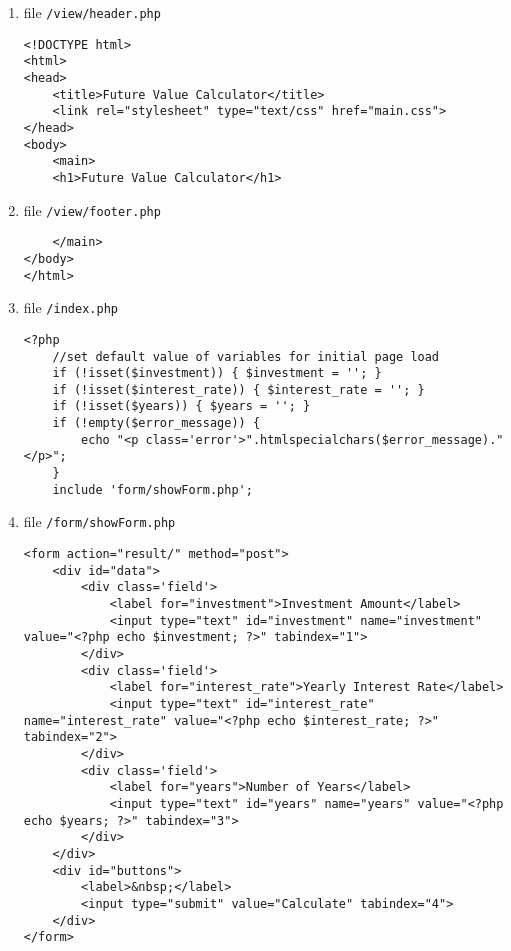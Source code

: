 \begin{enumerate}
\item file \texttt{/view/header.php}
\lstset{language=php,tabsize=2}
\begin{lstlisting}
<!DOCTYPE html>
<html>
<head>
	<title>Future Value Calculator</title>
	<link rel="stylesheet" type="text/css" href="main.css">
</head>
<body>
	<main>
	<h1>Future Value Calculator</h1>
\end{lstlisting}

\item file \texttt{/view/footer.php}
\lstset{language=php,tabsize=2}
\begin{lstlisting}
	</main>
</body>
</html>
\end{lstlisting}

\item file \texttt{/index.php}
\lstset{language=php,tabsize=2}
\begin{lstlisting}
<?php 
	//set default value of variables for initial page load
	if (!isset($investment)) { $investment = ''; } 
	if (!isset($interest_rate)) { $interest_rate = ''; } 
	if (!isset($years)) { $years = ''; } 
	if (!empty($error_message)) {
		echo "<p class='error'>".htmlspecialchars($error_message)."</p>";
	}
	include 'form/showForm.php';
\end{lstlisting}

\item file \texttt{/form/showForm.php}
\lstset{language=php,tabsize=2}
\begin{lstlisting}
<form action="result/" method="post">
	<div id="data">
		<div class='field'>
			<label for="investment">Investment Amount</label>
			<input type="text" id="investment" name="investment" value="<?php echo $investment; ?>" tabindex="1">
		</div>
		<div class='field'>
			<label for="interest_rate">Yearly Interest Rate</label>
			<input type="text" id="interest_rate" name="interest_rate" value="<?php echo $interest_rate; ?>" tabindex="2">
		</div>
		<div class='field'>
			<label for="years">Number of Years</label>
			<input type="text" id="years" name="years" value="<?php echo $years; ?>" tabindex="3">
		</div>
	</div>
	<div id="buttons">
		<label>&nbsp;</label>
		<input type="submit" value="Calculate" tabindex="4">
	</div>
</form>
\end{lstlisting}


\end{enumerate}
